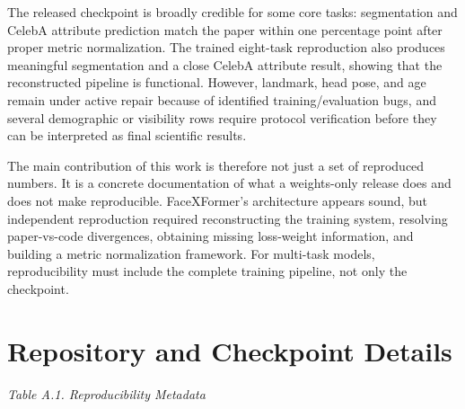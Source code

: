 \documentclass[11pt]{article}
\begin{document}
The released checkpoint is broadly credible for some core tasks: segmentation and CelebA attribute prediction match the paper within one percentage point after proper metric normalization. The trained eight-task reproduction also produces meaningful segmentation and a close CelebA attribute result, showing that the reconstructed pipeline is functional. However, landmark, head pose, and age remain under active repair because of identified training/evaluation bugs, and several demographic or visibility rows require protocol verification before they can be interpreted as final scientific results.


The main contribution of this work is therefore not just a set of reproduced numbers. It is a concrete documentation of what a weights-only release does and does not make reproducible. FaceXFormer's architecture appears sound, but independent reproduction required reconstructing the training system, resolving paper-vs-code divergences, obtaining missing loss-weight information, and building a metric normalization framework. For multi-task models, reproducibility must include the complete training pipeline, not only the checkpoint.


\appendix
\section{Repository and Checkpoint Details}

\emph{Table A.1. Reproducibility Metadata}
\end{document}
